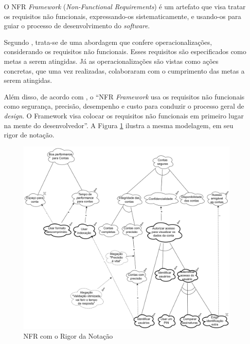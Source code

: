 \label{sec:nfr}

O NFR \textit{Framework} (\textit{Non-Functional Requirements}) é um artefato que visa tratar os requisitos não funcionais, expressando-os sistematicamente, e usando-os para guiar o processo de desenvolvimento do \textit{software}.

Segundo , trata-se de uma abordagem que confere operacionalizações, considerando os requisitos não funcionais. Esses requisitos são especificados como metas a serem atingidas. Já as operacionalizações são vistas como ações concretas, que uma vez realizadas, colaboraram com o cumprimento das metas a serem atingidas.

Além disso, de acordo com , o “NFR \textit{Framework} usa os requisitos não funcionais como segurança, precisão, desempenho e custo para conduzir o processo geral de \textit{design}. O Framework visa colocar os requisitos não funcionais em primeiro lugar na mente do desenvolvedor”. A Figura \ref{fig:nfr_original} ilustra a mesma modelagem, em seu rigor de notação.

\begin{figure}[H]
    \begin{center}
        \caption{NFR com o Rigor da Notação}
        \label{fig:nfr_original}
        \includegraphics[scale=0.41]{figuras/Embasamento/nfr_rigor_v2.png}
    \end{center}
\end{figure}


